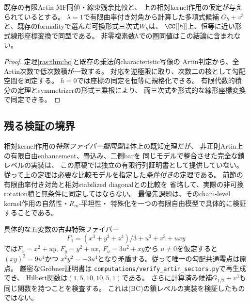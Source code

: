 \begin{corollary}[混合族に関する条件付き正式]\label{ras:cor:formal-G}
既存の有限Artin MF同値・線束残余比較と、
上の相対kernel作用の仮定が与えられているとする。
$\lambda=1$で有限曲率付き対角から計算した多項式候補
$G_h+v^3$と、既存のformalityで選んだ可換形式三次式$W_h$は、
$\CC[[h]]$上、恒等に近い形式線形座標変換で同型である。
非零複素数$h$での圏同値はこの結論に含まれない。
\end{corollary}
\begin{proof}
定理\ref{ras:thm:bc}と既存の乗法的characteristic写像の
Artin判定から、全Artin次数で低次数積が一致する。
対応を逆極限に取り、次数二の核として勾配空間を同定する。
$h=0$では座標の同定を恒等に規格化できる。
有限代数的積分の定理とsymmetrizerの形式三乗根により、
両三次式を形式的な線形座標変換で同定できる。
\end{proof}

\subsection{残る検証の境界}

相対kernel作用の\emph{特殊ファイバー擬同型}は体上の既知定理だが、
非正則Artin上の有限自由enhancement、畳込み、二側barを
同じモデルで整合させた完全な鎖レベルの実装は、
この原稿では独立の有限行列証明書として提供していない。
従って上の定理は必要な比較モデルを指定した\emph{条件付き}の定理である。
前節の有限曲率付き対角と相対stabilized diagonalとの比較を
省略して、実際の非可換rotation積と無条件に同定してはならない。
最優先課題は、そのchain-level kernel作用の自然性・$R_m$-平坦性・
特殊化を一つの有限自由模型で具体的に検証することである。

具体的な五変数の古典特殊ファイバー
\[
 F_1=(x^3+y^3+z^3)/3+u^3+v^3+uxy
\]
では$F_x=x^2+uy$, $F_y=y^2+ux$, $F_u=3u^2+xy$から
$u\ne0$を仮定すると$(xy)^2=9u^4$かつ
$x^2y^2=-3u^4$となり矛盾する。従って唯一の勾配共通零点は原点。
厳密なGr\"obner証明書は
\texttt{computations/verify\_artin\_sectors.py}で再生成でき、
Hilbert関数は$(1,5,10,10,5,1)$である。
さらに計算済み候補$G_{1/2}+v^3$も同じ関数を持つことを検査する。
これは(BC)の鎖レベルの実装を検証したものではない。
